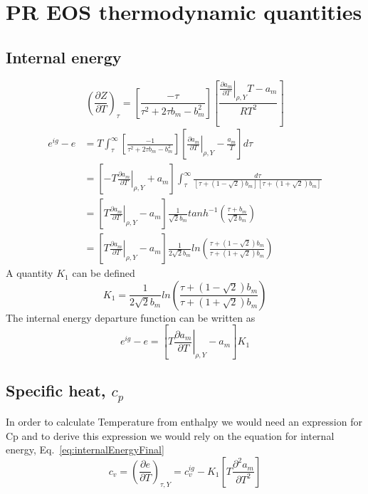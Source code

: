 \documentclass[11pt]{article}
\begin{document}
\section{PR EOS thermodynamic quantities}
\subsection*{Internal energy}
\label{sec:AppdxInternalEnergy}
\begin{equation}
\left(\frac{\partial Z}{\partial T}\right)_{\tau} = \left[ \frac{-\tau}{\tau^{2}+ 2\tau b_m - b_m^{2}}\right]\left[ \frac{ \left . \frac{\partial a_{m}}{\partial T} \right |_{\rho,Y}T -a_{m}}{R T^{2}}\right]
\end{equation}
\begin{align}
e^{ig} - e & = T \int_{\tau}^{\infty} \left[ \frac{-1}{\tau^{2}+2 \tau b_m-b_m^{2}}\right] \left[ \left . \frac{\partial a_{m}}{\partial T} \right |_{\rho,Y} - \frac{a_{m}}{T}\right] d\tau \\
               & = \left[ -T \left . \frac{\partial a_{m}}{\partial T} \right |_{\rho,Y} + a_{m}\right] \int_{\tau}^{\infty} \frac{d\tau}{\left[\tau+(1-\sqrt{2}) b_{m} \right] \left[ \tau+(1+\sqrt{2}) b_{m} \right]} \\
               & = \left[ T \left . \frac{\partial a_{m}}{\partial T} \right |_{\rho,Y} - a_{m}\right] \frac{1}{\sqrt{2}b_{m}} tanh^{-1}\left(\frac{\tau+b_{m}}{\sqrt{2}b_{m}}\right) \\
               & = \left[ T \left . \frac{\partial a_{m}}{\partial T} \right |_{\rho,Y} - a_{m}\right] \frac{1}{2 \sqrt{2}b_{m}} ln \left(\frac{\tau+(1-\sqrt{2}) b_{m}}{\tau+(1+\sqrt{2}) b_{m}}\right)
\end{align}
A quantity $K_1$ can be defined 
\begin{equation}
K_1 = \frac{1}{2 \sqrt{2}b_{m}} ln \left(\frac{\tau+(1-\sqrt{2}) b_{m}}{\tau+(1+\sqrt{2}) b_{m}}\right)
\end{equation}
The internal energy departure function can be written as 
\begin{equation}
e^{ig} - e = \left[ T \left . \frac{\partial a_{m}}{\partial T} \right |_{\rho,Y} - a_{m}\right] K_1
\label{eq:internalEnergyFinal}
\end{equation}
\subsection*{Specific heat, $c_{p}$}
\label{sec:AppdxSpecificHeat}
 In order to calculate Temperature from enthalpy we would need an expression for Cp and to derive this expression we would rely on the equation for internal energy, Eq.~\ref{eq:internalEnergyFinal}
\begin{equation}
c_{v} = \left(\frac{\partial e}{\partial T}\right)_{\tau,Y} = c_{v}^{ig} - K_1 \left[T \frac{\partial^{2} a_{m}}{\partial T^{2}} \right]
\end{equation}
\end{document}
